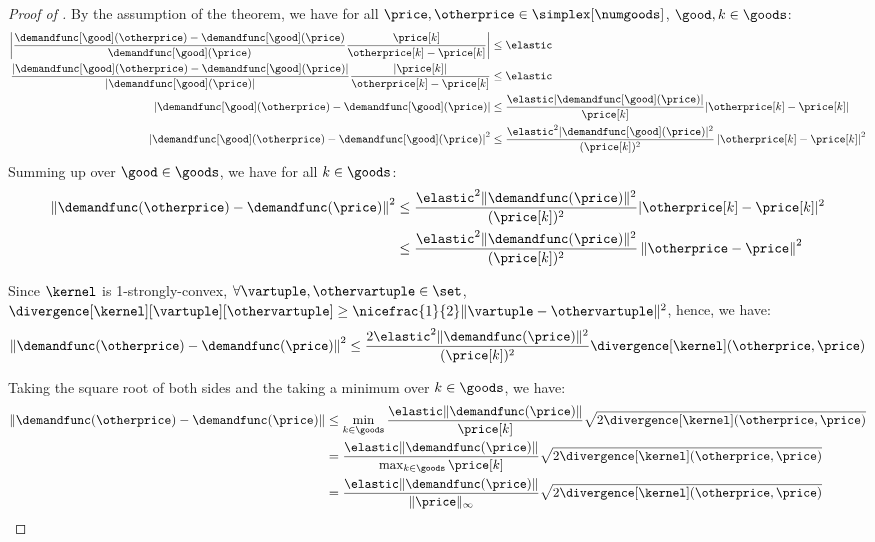 \lemmabregmancontelastic*
\begin{proof}[Proof of ]
    By the assumption of the theorem, we have for all $\price, \otherprice \in \simplex[\numgoods]$, $\good, k \in \goods$:
    \begin{align*}
        \left|\frac{\demandfunc[\good](\otherprice) - \demandfunc[\good](\price)}{\demandfunc[\good](\price)} \frac{\price[k]}{\otherprice[k] - \price[k]} \right| &\leq \elastic\\
        \frac{\left|\demandfunc[\good](\otherprice) - \demandfunc[\good](\price)\right| }{|\demandfunc[\good](\price)|} \frac{|\price[k]|}{\otherprice[k] - \price[k]} 
        &\leq \elastic\\
        \left|\demandfunc[\good](\otherprice) - \demandfunc[\good](\price)  \right| &\leq \frac{\elastic |\demandfunc[\good](\price)|}{\price[k]} |\otherprice[k] - \price[k]|\\
        \left|\demandfunc[\good](\otherprice) - \demandfunc[\good](\price)  \right|^2 &\leq \frac{\elastic^2 |\demandfunc[\good](\price)|^2}{(\price[k])^2} \left|\otherprice[k] - \price[k]\right|^2
    \end{align*}
    Summing up over $\good \in \goods$, we have for all $k \in \goods$:
    \begin{align*}
        \left\|\demandfunc(\otherprice) - \demandfunc(\price)  \right\|^2 &\leq \frac{\elastic^2 \|\demandfunc(\price)\|^2}{(\price[k])^2} |\otherprice[k] - \price[k]|^2\\
        &\leq \frac{\elastic^2 \|\demandfunc(\price)\|^2}{(\price[k])^2} \left\|\otherprice - \price\right\|^2
    \end{align*}

    Since $\kernel$ is 1-strongly-convex, $\forall \vartuple, \othervartuple \in \set$, $\divergence[\kernel][{\vartuple}][{\othervartuple}] \geq \nicefrac{1}{2}\| \vartuple - \othervartuple\|^2$, hence, we have:
    \begin{align*}
        \left\|\demandfunc(\otherprice) - \demandfunc(\price)  \right\|^2 \leq \frac{2\elastic^2 \|\demandfunc(\price)\|^2}{(\price[k])^2} \divergence[\kernel](\otherprice,\price) 
    \end{align*}

    Taking the square root of both sides and the taking a minimum over $k \in \goods$, we have:
    \begin{align*}
        \left\|\demandfunc(\otherprice) - \demandfunc(\price)  \right\| &\leq \min_{k \in \goods}\frac{\elastic \|\demandfunc(\price)\|}{\price[k]} \sqrt{2\divergence[\kernel](\otherprice,\price)} \\
        &= \frac{\elastic \|\demandfunc(\price)\|}{\max_{k \in \goods} \price[k]} \sqrt{2\divergence[\kernel](\otherprice,\price)}\\
        &= \frac{\elastic \|\demandfunc(\price)\|}{\|\price\|_\infty} \sqrt{2\divergence[\kernel](\otherprice,\price)}
    \end{align*}


\end{proof}
